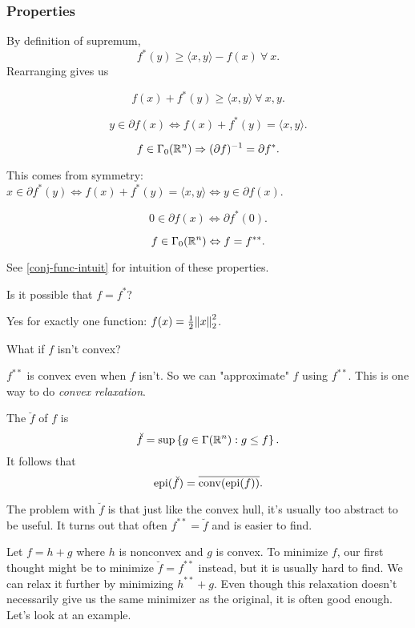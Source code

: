 \documentclass[class=article,crop=false]{standalone}
\begin{document}
 \subsubsection{Properties}
 By definition of supremum,
 \[
	 f^* (y) \geq \langle x,y \rangle -f(x) \ \forall \ x
 .\]
Rearranging gives us
\begin{thm}
\[
	f(x) + f^* (y) \geq \langle x,y \rangle \ \forall \ x,y
.\]
\end{thm}
\begin{coro}[16.23 BC17]
\[
	y \in \partial f(x) \iff f(x) + f^* (y) = \langle x,y \rangle
.\] 
\end{coro}
\begin{coro}[16.24]
	\[ f \in \Gamma_0(\mathbb{R}^{n}) \Rightarrow (\partial f)^{-1} = \partial f^* .\]
\end{coro}
\begin{remark}
	This comes from symmetry: $ x \in \partial f^* (y) \iff f(x) + f^* (y) =\langle x,y \rangle \iff y \in \partial f(x)$.
\end{remark}
\begin{coro}
\[
	0 \in \partial f(x) \iff \partial f^* (0)
.\] 
\end{coro}

\begin{prop}
	\[
		f \in \Gamma_0(\mathbb{R}^{n}) \Leftrightarrow f=f^{* *}   
	.\] 
\end{prop}
See \cref{conj-func-intuit} for intuition of these properties.
\begin{ques}
	Is it possible that $ f=f^* $?
\end{ques}
Yes for exactly one function: $ f(x) = \frac{1}{2} {\left\lVert{ x}\right\rVert}_2^2 $.
\begin{ques}
What if $ f$ isn't convex?
\end{ques}
	$ f^{** } $ is convex even when $ f$ isn't. So we can "approximate"  $ f$ using  $ f^{** }$. This is one way to do \emph{convex relaxation}. 

\begin{defn}
	The  $ \breve{f}$ of $ f$ is
	 \[
		 \breve{f} = \sup\left\{g \in \Gamma(\mathbb{R}^{n}): g \leq f \right\} 
	.\] 
	It follows that
	\[
		\operatorname{epi}(\breve{f}) = \overline{\operatorname{conv}(\operatorname{epi}(f))}
	.\] 
\end{defn}
The problem with $ \breve{f}$ is that just like the convex hull, it's usually too abstract to be useful. It turns out that often $ f^{* *}= \breve{f}$ and is easier to find.

\begin{eg}
	Let $ f=h+g$ where  $ h$ is nonconvex and  $ g$ is convex. To minimize $ f$, our first thought might be to minimize  $\breve{f}= f^{* *}$ instead, but it is usually hard to find. We can relax it further by minimizing $ h^{* *} + g$. Even though this relaxation doesn't necessarily give us the same minimizer as the original, it is often good enough. Let's look at an example.
\end{eg}
\end{document}
